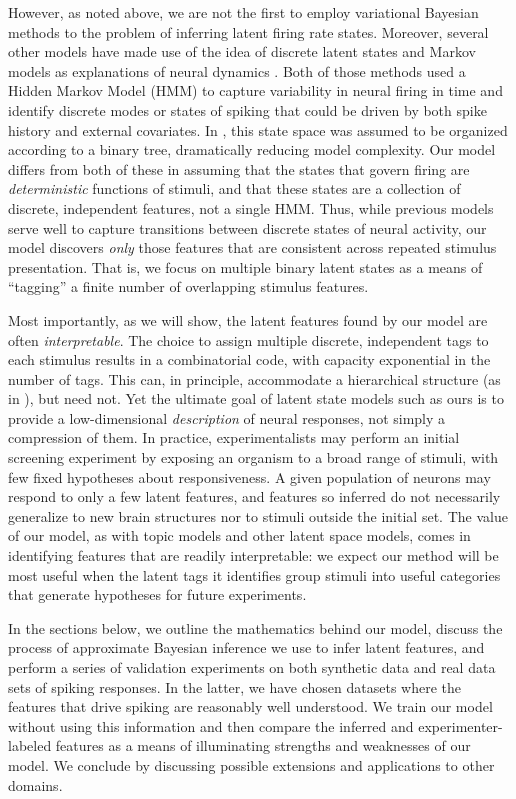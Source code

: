 \documentclass[10pt,letterpaper]{article}
\newcommand{\added}[1]{\textcolor{added}{#1}}
\begin{document}
\added{However, as noted above, we are not the first to employ variational Bayesian methods to the problem of inferring latent firing rate states. Moreover, several other models have made use of the idea of discrete latent states and Markov models as explanations of neural dynamics \cite{Escola2011-gk, Putzky2014-up}. Both of those methods used a Hidden Markov Model (HMM) to capture variability in neural firing in time and identify discrete modes or states of spiking that could be driven by both spike history and external covariates. In \cite{Putzky2014-up}, this state space was assumed to be organized according to a binary tree, dramatically reducing model complexity. Our model differs from both of these in assuming that the states that govern firing are \emph{deterministic} functions of stimuli, and that these states are a collection of discrete, independent features, not a single HMM. Thus, while previous models serve well to capture transitions between discrete states of neural activity, our model discovers \emph{only} those features that are consistent across repeated stimulus presentation. That is,} we focus on multiple binary latent states as a means of ``tagging'' a finite number of overlapping stimulus features.

\added{
Most importantly, as we will show, the latent features found by our model are often \emph{interpretable}. The choice to assign multiple discrete, independent tags to each stimulus results in a combinatorial code, with capacity exponential in the number of tags. This can, in principle, accommodate a hierarchical structure (as in \cite{Putzky2014-up}), but need not. Yet the ultimate goal of latent state models such as ours is to provide a low-dimensional \emph{description} of neural responses, not simply a compression of them. In practice, experimentalists may perform an initial screening experiment by exposing an organism to a broad range of stimuli, with few fixed hypotheses about responsiveness. A given population of neurons may respond to only a few latent features, and features so inferred do not necessarily generalize to new brain structures nor to stimuli outside the initial set. The value of our model, as with topic models and other latent space models, comes in identifying features that are readily interpretable: we expect our method will be most useful when the latent tags it identifies group stimuli into useful categories that generate hypotheses for future experiments.
}

\added{
In the sections below, we outline the mathematics behind our model, discuss the process of approximate Bayesian inference we use to infer latent features, and perform a series of validation experiments on both synthetic data and real data sets of spiking responses. In the latter, we have chosen datasets where the features that drive spiking are reasonably well understood. We train our model without using this information and then compare the inferred and experimenter-labeled features as a means of illuminating strengths and weaknesses of our model. We conclude by discussing possible extensions and applications to other domains.
}
\end{document}
